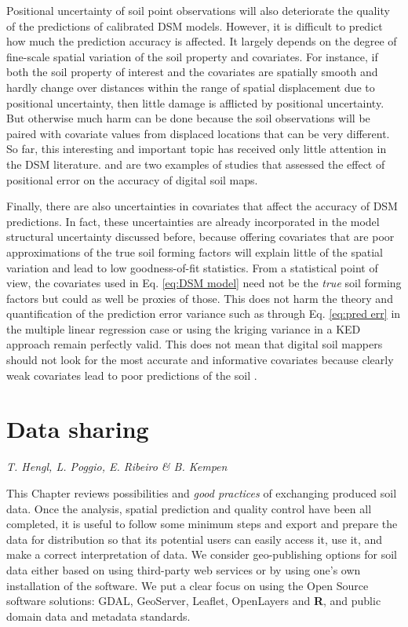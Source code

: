 \documentclass[10pt,b5paper,]{book}
\theoremstyle{definition}
\theoremstyle{definition}
\theoremstyle{definition}
\theoremstyle{remark}
\begin{document}
Positional uncertainty of soil point observations will also deteriorate
the quality of the predictions of calibrated DSM models. However, it is
difficult to predict how much the prediction accuracy is affected. It
largely depends on the degree of fine-scale spatial variation of the
soil property and covariates. For instance, if both the soil property of
interest and the covariates are spatially smooth and hardly change over
distances within the range of spatial displacement due to positional
uncertainty, then little damage is afflicted by positional uncertainty.
But otherwise much harm can be done because the soil observations will
be paired with covariate values from displaced locations that can be
very different. So far, this interesting and important topic has
received only little attention in the DSM literature.
\cite{grimm2010uncertainty} and \cite{nelson2011error} are two examples
of studies that assessed the effect of positional error on the accuracy
of digital soil maps.

Finally, there are also uncertainties in covariates that affect the
accuracy of DSM predictions. In fact, these uncertainties are already
incorporated in the model structural uncertainty discussed before,
because offering covariates that are poor approximations of the true
soil forming factors will explain little of the spatial variation and
lead to low goodness-of-fit statistics. From a statistical point of
view, the covariates used in Eq. \ref{eq:DSM model} need not be the
\emph{true} soil forming factors but could as well be proxies of those.
This does not harm the theory and quantification of the prediction error
variance such as through Eq. \ref{eq:pred err} in the multiple linear
regression case or using the kriging variance in a KED approach remain
perfectly valid. This does not mean that digital soil mappers should not
look for the most accurate and informative covariates because clearly
weak covariates lead to poor predictions of the soil
\citep{samuel2015more}.

\hypertarget{data-sharing}{%
\chapter{Data sharing}\label{data-sharing}}

\emph{T. Hengl, L. Poggio, E. Ribeiro \& B. Kempen}

This Chapter reviews possibilities and \emph{good practices} of
exchanging produced soil data. Once the analysis, spatial prediction and
quality control have been all completed, it is useful to follow some
minimum steps and export and prepare the data for distribution so that
its potential users can easily access it, use it, and make a correct
interpretation of data. We consider geo-publishing options for soil data
either based on using third-party web services or by using one's own
installation of the software. We put a clear focus on using the Open
Source software solutions: GDAL, GeoServer, Leaflet, OpenLayers and
\textbf{R}, and public domain data and metadata standards.
\end{document}
